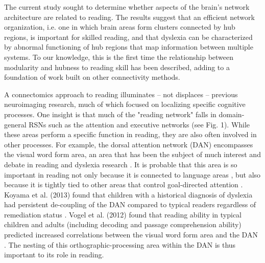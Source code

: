
The current study sought to determine whether aspects of the brain's network architecture are related to reading. The results suggest that an efficient network organization, i.e. one in which brain areas form clusters connected by hub regions, is important for skilled reading, and that dyslexia can be characterized by abnormal functioning of hub regions that map information between multiple systems. To our knowledge, this is the first time the relationship between modularity and hubness to reading skill has been described, adding to a foundation of work built on other connectivity methods.

A connectomics approach to reading illuminates -- not displaces -- previous neuroimaging research, much of which focused on localizing specific cognitive processes. One insight is that much of the "reading network" falls in domain-general RSNs such as the attention and executive networks (see Fig. 1). While these areas perform a specific function in reading, they are also often involved in other processes. For example, the dorsal attention network (DAN) encompasses the visual word form area, an area that has been the subject of much interest and debate in reading and dyslexia research \citep{McCandliss2003}. It is probable that this area is so important in reading not only because it is connected to language areas \citep{Bouhali2014}, but also because it is tightly tied to other areas that control goal-directed attention \citep{Vogel2014}. Koyama et al. (2013) found that children with a historical diagnosis of dyslexia had persistent de-coupling of the DAN compared to typical readers regardless of remediation status \citep{Koyama2013}. Vogel et al. (2012) found that reading ability in typical children and adults (including decoding and passage comprehension ability) predicted increased correlations between the visual word form area and the DAN \citep{Vogel2012a}. The nesting of this orthographic-processing area within the DAN is thus important to its role in reading.

